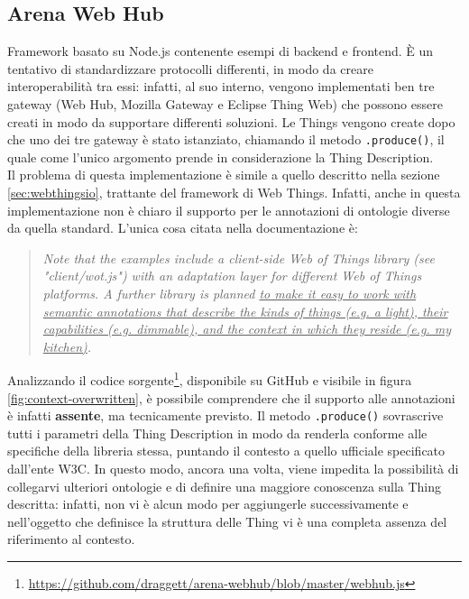 \documentclass[12pt,a4paper,openright,oneside]{report}
\begin{document}
\subsection{Arena Web Hub}
Framework basato su Node.js contenente esempi di backend e frontend. È un tentativo di standardizzare protocolli differenti, in modo da creare interoperabilità tra essi: infatti, al suo interno, vengono implementati ben tre gateway (Web Hub, Mozilla Gateway e Eclipse Thing Web) che possono essere creati in modo da supportare differenti soluzioni. Le Things vengono create dopo che uno dei tre gateway è stato istanziato, chiamando il metodo \texttt{.produce()}, il quale come l'unico argomento prende in considerazione la Thing Description.\\

Il problema di questa implementazione è simile a quello descritto nella sezione \ref{sec:webthingsio}, trattante del framework di Web Things. Infatti, anche in questa implementazione non è chiaro il supporto per le annotazioni di ontologie diverse da quella standard. L'unica cosa citata nella documentazione è:

\begin{quote}
\textit{Note that the examples include a client-side Web of Things library (see "client/wot.js") with an adaptation layer for different Web of Things platforms. A further library is planned \ul{to make it easy to work with semantic annotations that describe the kinds of things (e.g. a light), their capabilities (e.g. dimmable), and the context in which they reside (e.g. my kitchen)}.}
\end{quote}

Analizzando il codice sorgente\footnote{\url{https://github.com/draggett/arena-webhub/blob/master/webhub.js}}, disponibile su GitHub e visibile in figura \ref{fig:context-overwritten}, è possibile comprendere che il supporto alle annotazioni è infatti \textbf{assente}, ma tecnicamente previsto. Il metodo \texttt{.produce()} sovrascrive tutti i parametri della Thing Description in modo da renderla conforme alle specifiche della libreria stessa, puntando il contesto a quello ufficiale specificato dall'ente W3C. In questo modo, ancora una volta, viene impedita la possibilità di collegarvi ulteriori ontologie e di definire una maggiore conoscenza sulla Thing descritta: infatti, non vi è alcun modo per aggiungerle successivamente e nell'oggetto che definisce la struttura delle Thing vi è una completa assenza del riferimento al contesto.\\
\end{document}
